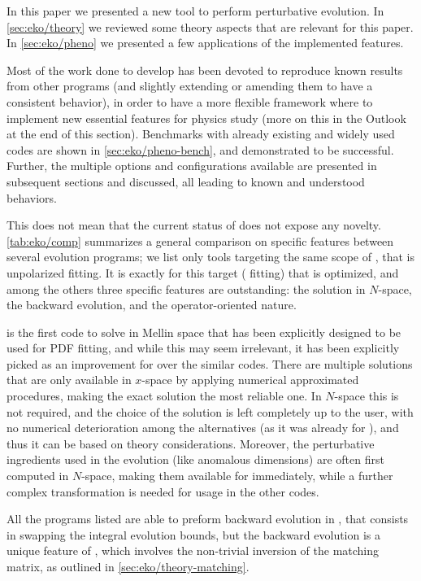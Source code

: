 In this paper we presented a new \qcd{} tool to perform perturbative \dglap{}
evolution.
In \cref{sec:eko/theory} we reviewed some theory aspects that are relevant
for this paper. In \cref{sec:eko/pheno} we presented a few applications
of the implemented \eko{} features.

Most of the work done to develop \eko{} has been devoted to reproduce known
results from other programs (and slightly extending or amending them to have a
consistent behavior), in order to have a more flexible framework where to
implement new essential features for physics study (more on this in the Outlook
at the end of this section).
Benchmarks with already existing and widely used codes are shown in
\cref{sec:eko/pheno-bench}, and demonstrated to be successful.
Further, the multiple options and configurations available are presented in
subsequent sections and discussed, all leading to known and understood
behaviors.

This does not mean that the current status of \eko{} does not expose any
novelty. \cref{tab:eko/comp} summarizes a general comparison on specific features
between several evolution programs; we list only tools targeting the same scope
of \eko{}, that is unpolarized \pdf{} fitting.
It is exactly for this target (\pdf{} fitting) that \eko{} is optimized, and
among the others three specific features are outstanding: the solution in
$N$-space, the backward \vfns{} evolution, and the operator-oriented nature.

\eko{} is the first code to solve \dglap{} in Mellin space that has been
explicitly designed to be used for PDF fitting, and while this may seem
irrelevant, it has been explicitly picked as an improvement for \eko{} over the
similar codes.
There are multiple solutions that are only available in $x$-space by applying
numerical approximated procedures, making the exact solution the most reliable
one. In $N$-space this is not required, and the choice of the solution is
left completely up to the user, with no numerical deterioration among the
alternatives (as it was already for \pegasus{}), and thus it can be based on
theory considerations.
Moreover, the perturbative \qcd{} ingredients used in the evolution (like
anomalous dimensions) are often first computed in $N$-space, making them
available for \eko{} immediately, while a further complex transformation is
needed for usage in the other codes.

All the programs listed are able to preform backward evolution in \ffns{}, that
consists in swapping the integral evolution bounds, but the \vfns{} backward
evolution is a unique feature of \eko{}, which involves the non-trivial
inversion of the matching matrix, as outlined in \cref{sec:eko/theory-matching}.

